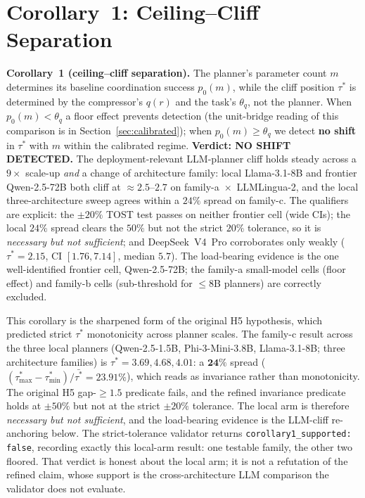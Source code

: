 \section{Corollary~1: Ceiling--Cliff Separation}
\label{sec:corollary1}

\begin{tcolorbox}[colback=black!4, colframe=black!50, sharp corners,
                  boxrule=0.4pt, boxsep=2pt, left=4pt, right=4pt,
                  top=2pt, bottom=2pt]
\textbf{Corollary~1 (ceiling--cliff separation).}
The planner's parameter count $m$ determines its baseline
coordination success $p_0(m)$, while the cliff position $\tau^{*}$ is
determined by the compressor's $q(r)$ and the task's $\theta_q$, not
the planner. When $p_0(m)<\theta_q$ a floor effect prevents detection
(the unit-bridge reading of this comparison is in
Section~\ref{sec:calibrated}); when $p_0(m)\ge\theta_q$ we detect
\textbf{no shift} in $\tau^{*}$ with $m$ within the calibrated regime.
\textbf{Verdict: NO SHIFT DETECTED.} The deployment-relevant
LLM-planner cliff holds steady across a $9\times$ scale-up \emph{and}
a change of architecture family: local Llama-3.1-8B and frontier
Qwen-2.5-72B both cliff at $\approx2.5$--$2.7$ on
family-a~$\times$~LLMLingua-2, and the local three-architecture sweep
agrees within a $24\%$ spread on family-c. The qualifiers are
explicit: the $\pm20\%$ TOST test passes on neither frontier cell
(wide CIs); the local $24\%$ spread clears the $50\%$ but not the
strict $20\%$ tolerance, so it is \emph{necessary but not
sufficient}; and DeepSeek~V4~Pro corroborates only weakly
($\tau^{*}=2.15$, CI $[1.76,7.14]$, median $5.7$). The load-bearing
evidence is the one well-identified frontier cell, Qwen-2.5-72B; the
family-a small-model cells (floor effect) and family-b cells
(sub-threshold for $\le8$B planners) are correctly excluded.
\end{tcolorbox}

This corollary is the sharpened form of the original H5 hypothesis,
which predicted strict $\tau^{*}$ monotonicity across planner scales.
The family-c result across the three local planners (Qwen-2.5-1.5B,
Phi-3-Mini-3.8B, Llama-3.1-8B; three architecture families) is
$\tau^{*}=3.69, 4.68, 4.01$: a $\mathbf{24\%}$ spread
($(\tau^{*}_{\max}-\tau^{*}_{\min})/\bar{\tau^{*}}=23.91\%$), which
reads as invariance rather than monotonicity. The original H5
gap-$\ge1.5$ predicate fails, and the refined invariance predicate
holds at $\pm50\%$ but not at the strict $\pm20\%$ tolerance. The
local arm is therefore \emph{necessary but not sufficient}, and the
load-bearing evidence is the LLM-cliff re-anchoring below.
The strict-tolerance validator returns
\texttt{corollary1\_supported: false}, recording exactly this
local-arm result: one testable family, the other two floored. That
verdict is honest about the local arm; it is not a refutation of the
refined claim, whose support is the cross-architecture LLM comparison
the validator does not evaluate.

